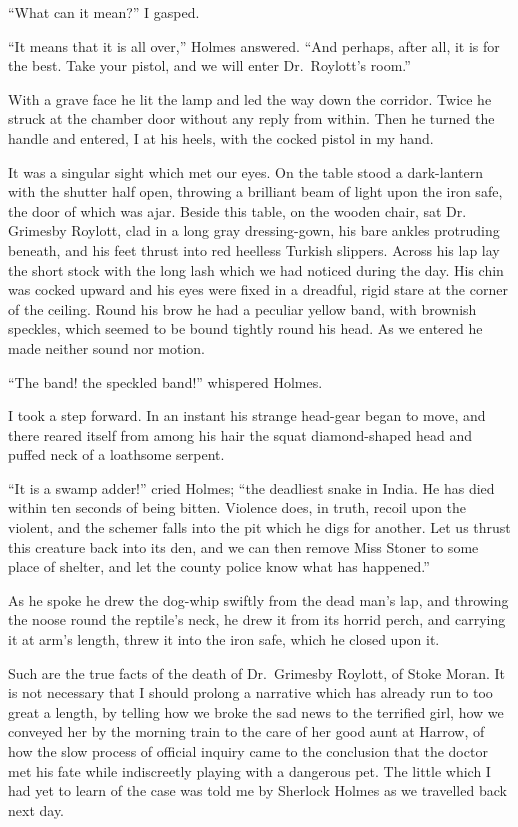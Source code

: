“What can it mean?” I gasped.

“It means that it is all over,” Holmes answered. “And
perhaps, after all, it is for the best. Take your pistol, and we
will enter Dr.\ Roylott’s room.”

With a grave face he lit the lamp and led the way down
the corridor. Twice he struck at the chamber door without
any reply from within. Then he turned the handle and entered,
I at his heels, with the cocked pistol in my hand.

It was a singular sight which met our eyes. On the table
stood a dark-lantern with the shutter half open, throwing a
brilliant beam of light upon the iron safe, the door of which
was ajar. Beside this table, on the wooden chair, sat Dr.\ %
Grimesby Roylott, clad in a long gray dressing-gown, his bare
ankles protruding beneath, and his feet thrust into red heelless
Turkish slippers. Across his lap lay the short stock with
the long lash which we had noticed during the day. His chin
was cocked upward and his eyes were fixed in a dreadful,
rigid stare at the corner of the ceiling. Round his brow he
had a peculiar yellow band, with brownish speckles, which
seemed to be bound tightly round his head. As we entered
he made neither sound nor motion.

“The band! the speckled band!” whispered Holmes.

I took a step forward. In an instant his strange head-gear
began to move, and there reared itself from among his hair
the squat diamond-shaped head and puffed neck of a loathsome
serpent.

“It is a swamp adder!” cried Holmes; “the deadliest
snake in India. He has died within ten seconds of being
bitten. Violence does, in truth, recoil upon the violent, and
the schemer falls into the pit which he digs for another. Let
us thrust this creature back into its den, and we can then remove
Miss Stoner to some place of shelter, and let the county
police know what has happened.”

As he spoke he drew the dog-whip swiftly from the dead
man’s lap, and throwing the noose round the reptile’s neck, he
drew it from its horrid perch, and carrying it at arm’s length,
threw it into the iron safe, which he closed upon it.

\strut

Such are the true facts of the death of Dr.\ Grimesby Roylott,
of Stoke Moran. It is not necessary that I should prolong
a narrative which has already run to too great a length,
by telling how we broke the sad news to the terrified girl, how
we conveyed her by the morning train to the care of her good
aunt at Harrow, of how the slow process of official inquiry
came to the conclusion that the doctor met his fate while
indiscreetly playing with a dangerous pet. The little which I
had yet to learn of the case was told me by Sherlock Holmes
as we travelled back next day.

